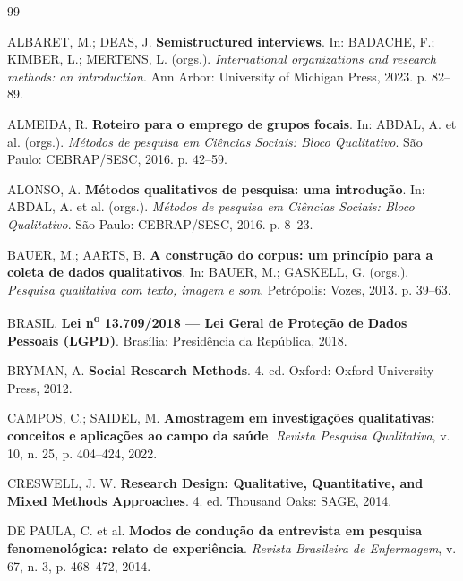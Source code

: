 \documentclass[12pt, a4paper, openany]{book}
\begin{document}
\begin{thebibliography}{99}

ALBARET, M.; DEAS, J. \textbf{Semistructured interviews}. In: BADACHE, F.; KIMBER, L.; MERTENS, L. (orgs.). \textit{International organizations and research methods: an introduction}. Ann Arbor: University of Michigan Press, 2023. p. 82--89.

ALMEIDA, R. \textbf{Roteiro para o emprego de grupos focais}. In: ABDAL, A. et al. (orgs.). \textit{M\'etodos de pesquisa em Ci\^encias Sociais: Bloco Qualitativo}. S\~ao Paulo: CEBRAP/SESC, 2016. p. 42--59.

ALONSO, A. \textbf{M\'etodos qualitativos de pesquisa: uma introdu\c{c}\~ao}. In: ABDAL, A. et al. (orgs.). \textit{M\'etodos de pesquisa em Ci\^encias Sociais: Bloco Qualitativo}. S\~ao Paulo: CEBRAP/SESC, 2016. p. 8--23.

BAUER, M.; AARTS, B. \textbf{A constru\c{c}\~ao do corpus: um princ\'ipio para a coleta de dados qualitativos}. In: BAUER, M.; GASKELL, G. (orgs.). \textit{Pesquisa qualitativa com texto, imagem e som}. Petr\'opolis: Vozes, 2013. p. 39--63.

BRASIL. \textbf{Lei n\textsuperscript{o} 13.709/2018 --- Lei Geral de Prote\c{c}\~ao de Dados Pessoais (LGPD)}. Bras\'ilia: Presid\^encia da Rep\'ublica, 2018.

BRYMAN, A. \textbf{Social Research Methods}. 4. ed. Oxford: Oxford University Press, 2012.

CAMPOS, C.; SAIDEL, M. \textbf{Amostragem em investiga\c{c}\~oes qualitativas: conceitos e aplica\c{c}\~oes ao campo da sa\'ude}. \textit{Revista Pesquisa Qualitativa}, v. 10, n. 25, p. 404--424, 2022.

CRESWELL, J. W. \textbf{Research Design: Qualitative, Quantitative, and Mixed Methods Approaches}. 4. ed. Thousand Oaks: SAGE, 2014.

DE PAULA, C. et al. \textbf{Modos de condu\c{c}\~ao da entrevista em pesquisa fenomenol\'ogica: relato de experi\^encia}. \textit{Revista Brasileira de Enfermagem}, v. 67, n. 3, p. 468--472, 2014.


\end{thebibliography}
\end{document}
